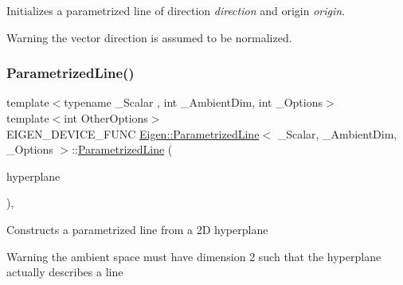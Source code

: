 Initializes a parametrized line of direction {\itshape direction} and origin {\itshape origin}. \begin{DoxyWarning}{Warning}
the vector direction is assumed to be normalized. 
\end{DoxyWarning}
\mbox{\label{class_eigen_1_1_parametrized_line_a6b4a0e4a98ea57f3a2b2d5669d24e909}} 
\subsubsection{\texorpdfstring{ParametrizedLine()}{ParametrizedLine()}\hspace{0.1cm}{\footnotesize\ttfamily [4/5]}}
{\footnotesize\ttfamily template$<$typename \+\_\+\+Scalar , int \+\_\+\+Ambient\+Dim, int \+\_\+\+Options$>$ \\
template$<$int Other\+Options$>$ \\
E\+I\+G\+E\+N\+\_\+\+D\+E\+V\+I\+C\+E\+\_\+\+F\+U\+NC \mbox{\hyperlink{class_eigen_1_1_parametrized_line}{Eigen\+::\+Parametrized\+Line}}$<$ \+\_\+\+Scalar, \+\_\+\+Ambient\+Dim, \+\_\+\+Options $>$\+::\mbox{\hyperlink{class_eigen_1_1_parametrized_line}{Parametrized\+Line}} (\begin{DoxyParamCaption}\item[{const \mbox{\hyperlink{class_eigen_1_1_hyperplane}{Hyperplane}}$<$ \+\_\+\+Scalar, \+\_\+\+Ambient\+Dim, Other\+Options $>$ \&}]{hyperplane }\end{DoxyParamCaption})\hspace{0.3cm}{\ttfamily [inline]}, {\ttfamily [explicit]}}

Constructs a parametrized line from a 2D hyperplane

\begin{DoxyWarning}{Warning}
the ambient space must have dimension 2 such that the hyperplane actually describes a line 
\end{DoxyWarning}
\mbox{\label{class_eigen_1_1_parametrized_line_a69aed1a96062648d4e61dce3b5fb896f}} 
